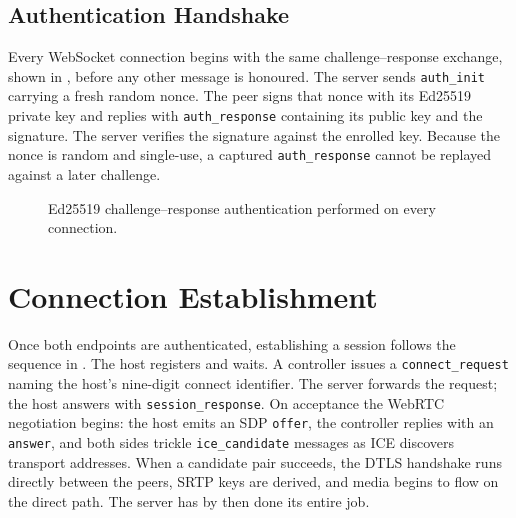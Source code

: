 \subsection{Authentication Handshake}

Every WebSocket connection begins with the same challenge--response exchange,
shown in , before any other message is honoured. The server
sends \texttt{auth\_init} carrying a fresh random nonce. The peer signs that
nonce with its Ed25519 private key and replies with \texttt{auth\_response}
containing its public key and the signature. The server verifies the signature
against the enrolled key. Because the nonce is random and single-use, a captured
\texttt{auth\_response} cannot be replayed against a later challenge.

\begin{figure}[H]
\centering
{}
\caption{Ed25519 challenge--response authentication performed on every
connection.}
\label{fig:auth}
\end{figure}

\section{Connection Establishment}

Once both endpoints are authenticated, establishing a session follows the
sequence in . The host registers and waits. A controller
issues a \texttt{connect\_request} naming the host's nine-digit connect
identifier. The server forwards the request; the host answers with
\texttt{session\_response}. On acceptance the WebRTC negotiation begins: the host
emits an SDP \texttt{offer}, the controller replies with an \texttt{answer}, and
both sides trickle \texttt{ice\_candidate} messages as ICE discovers transport
addresses. When a candidate pair succeeds, the DTLS handshake runs directly
between the peers, SRTP keys are derived, and media begins to flow on the direct
path. The server has by then done its entire job.

